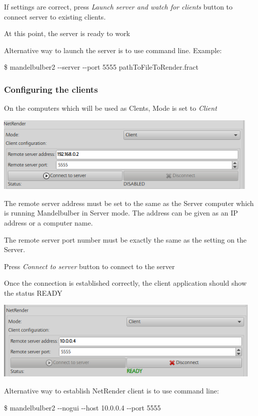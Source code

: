 If settings are correct, press \emph{Launch server and watch for
clients} button to connect server to existing clients.

At this point, the server is ready to work

Alternative way to launch the server is to use command line. Example:

\$ mandelbulber2 -\/-server -\/-port 5555 pathToFileToRender.fract

\subsubsection{Configuring the clients}\label{configuring-the-clients}

On the computers which will be used as Clents, Mode is set to
\emph{Client}

\includegraphics[width=5.02441in,height=1.43071in]{img/manual/media/image28.png}

The remote server address must be set to the same as the Server computer
which is running Mandelbulber in Server mode. The address can be given
as an IP address or a computer name.

The remote server port number must be exactly the same as the setting on
the Server.

Press \emph{Connect to server} button to connect to the server

Once the connection is established correctly, the client application
should show the status READY

\includegraphics[width=5.07283in,height=1.48976in]{img/manual/media/image29.png}

Alternative way to establish NetRender client is to use command line:

\$ mandelbulber2 -\/-nogui -\/-host 10.0.0.4 -\/-port 5555

